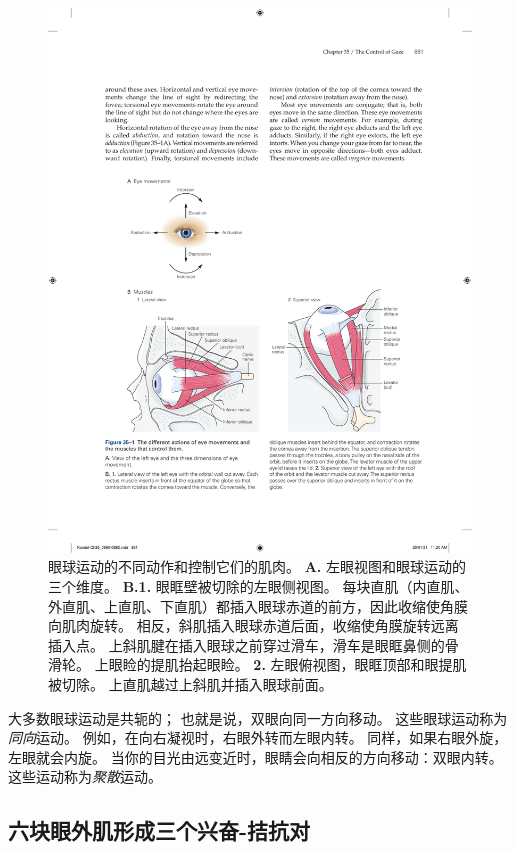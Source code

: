 \begin{figure}[htbp]
	\centering
	\includegraphics[width=1.0\linewidth]{chap35/fig_35_1}
	\caption{眼球运动的不同动作和控制它们的肌肉。
		\textbf{A.} 左眼视图和眼球运动的三个维度。
		\textbf{B.1.} 眼眶壁被切除的左眼侧视图。
		每块直肌（内直肌、外直肌、上直肌、下直肌）都插入眼球赤道的前方，因此收缩使角膜向肌肉旋转。
		相反，斜肌插入眼球赤道后面，收缩使角膜旋转远离插入点。
		上斜肌腱在插入眼球之前穿过滑车，滑车是眼眶鼻侧的骨滑轮。
		上眼睑的提肌抬起眼睑。
		\textbf{2.} 左眼俯视图，眼眶顶部和眼提肌被切除。 
		上直肌越过上斜肌并插入眼球前面。}
	\label{fig:35_1}
\end{figure}


大多数眼球运动是共轭的；
也就是说，双眼向同一方向移动。
这些眼球运动称为\textit{同向}运动。
例如，在向右凝视时，右眼外转而左眼内转。
同样，如果右眼外旋，左眼就会内旋。
当你的目光由远变近时，眼睛会向相反的方向移动：双眼内转。
这些运动称为\textit{聚散}运动。



\subsection{六块眼外肌形成三个兴奋-拮抗对}

